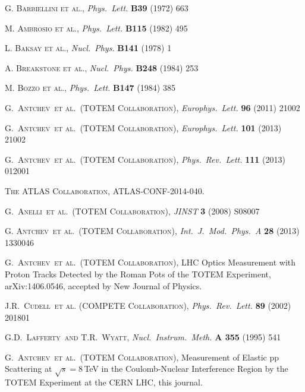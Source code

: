 \documentclass[3p,twocolumn]{elsarticle}
\def\etal{et al.}
\def\Name#1{\textsc{#1}, }
\def\REVIEW#1#2#3#4{{\it #1} {\bf #2} (#3) #4}
\begin{document}
\begin{thebibliography}{99}
%
 \Name{G. Barbiellini et al.} \REVIEW{Phys.~Lett.}{B39}{1972}{663}

 \Name{M. Ambrosio et al.} \REVIEW{Phys.~Lett.}{B115}{1982}{495}

 \Name{L. Baksay et al.} \REVIEW{Nucl.~Phys.}{B141}{1978}{1}

 \Name{A. Breakstone et al.} \REVIEW{Nucl.~Phys.}{B248}{1984}{253}

 \Name{M. Bozzo et al.} \REVIEW{Phys.~Lett.}{B147}{1984}{385}

	\Name{G.~Antchev~\etal{}~(TOTEM Collaboration)}
	\REVIEW{Europhys.~Lett.}{96}{2011}{21002}

	\Name{G.~Antchev~\etal{}~(TOTEM Collaboration)}
	\REVIEW{Europhys.~Lett.}{101}{2013}{21002}

	\Name{G.~Antchev~\etal{}~(TOTEM Collaboration)}
	\REVIEW{Phys.~Rev.~Lett.}{111}{2013}{012001}

 \Name{The ATLAS Collaboration} ATLAS-CONF-2014-040.

	\Name{G.~Anelli~\etal{}~(TOTEM Collaboration)}
	\REVIEW{JINST}{3}{2008}{S08007}


	\Name{G. Antchev~\etal{}~(TOTEM Collaboration)}
	\REVIEW{Int.~J.~Mod.~Phys.~A}{28}{2013}{1330046}

	\Name{G.~Antchev~\etal{}~(TOTEM Collaboration)}
	LHC Optics Measurement with Proton Tracks Detected by the Roman Pots of the TOTEM Experiment, 
	arXiv:1406.0546, accepted by New Journal of Physics.

	\Name{J.R.~Cudell~\etal{} (COMPETE Collaboration)}
	\REVIEW{Phys.\ Rev.\ Lett.}{89}{2002}{201801}

	\Name{G.D.~Lafferty~and T.R.~Wyatt}
	\REVIEW{Nucl.\ Instrum.\ Meth.}{A 355}{1995}{541}

	\Name{G.~Antchev~\etal{}~(TOTEM Collaboration)}
        Measurement of Elastic pp Scattering at $\sqrt{s}=8\,$TeV in the 
        Coulomb-Nuclear Interference Region by the TOTEM Experiment at the 
        CERN LHC, this journal.


\end{thebibliography}
\end{document}

